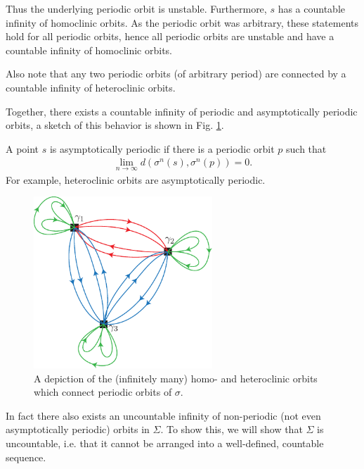 Thus the underlying periodic orbit is unstable. Furthermore, $s$ has a countable infinity of homoclinic orbits. As the periodic orbit was arbitrary, these statements hold for all periodic orbits, hence all periodic orbits are unstable and have a countable infinity of homoclinic orbits.

\begin{remark}[]
Also note that any two periodic orbits (of arbitrary period) are connected by a countable infinity of heteroclinic orbits.
\end{remark}
Together, there exists a countable infinity of periodic and asymptotically periodic orbits, a sketch of this behavior is shown in Fig. \ref{fig:crazy_orbits}.
\begin{definition}
	A point $s$ is asymptotically periodic if there is a periodic orbit $p$ such that 
	\begin{align}
		\boxed{
			\lim_{n\to \infty } d(\sigma^{n}(s), \sigma^{n}(p))=0.
		}
	\end{align}
For example, heteroclinic orbits are asymptotically periodic.
\end{definition}

\begin{figure}[h!]
	\centering
	\includegraphics[width=0.6\textwidth]{figures/ch6/21crazy_orbits.pdf}
	\caption{A depiction of the (infinitely many) homo- and heteroclinic orbits which connect periodic orbits of $\sigma $.}
	\label{fig:crazy_orbits}
\end{figure}

In fact there also exists an uncountable infinity of non-periodic (not even asymptotically periodic) orbits in $\Sigma$. To show this, we will show that $\Sigma$ is uncountable, i.e. that it cannot be arranged into a well-defined, countable sequence.

